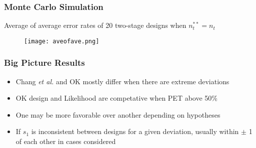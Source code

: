 \documentclass{beamer}\usepackage[]{graphicx}\usepackage[]{color}
\begin{document}
\begin{frame}
\frametitle{\small Monte Carlo Simulation}
\footnotesize
Average of average error rates of 20 two-stage designs when $n_t^{\ast\ast} = n_t$
\begin{figure}
\texttt{[image: aveofave.png]}
\end{figure}
\end{frame}



\begin{frame}
\frametitle{Big Picture Results}
    \begin{itemize}
        \item Chang \textit{et al.} and OK mostly differ when there are extreme deviations
        \item OK design and Likelihood are competative when PET above 50\%
        \item One may be more favorable over another depending on hypotheses
        \item If $s_1$ is inconsistent between designs for a given deviation, usually within $\pm$ 1 of each other in cases considered
    \end{itemize}
\end{frame}
\end{document}
